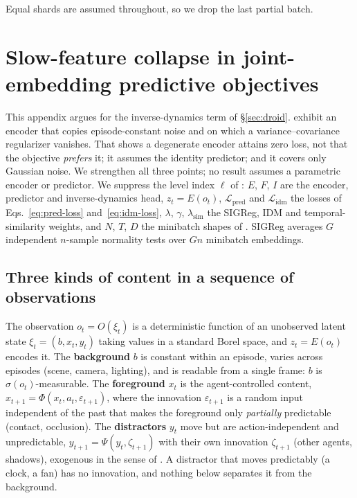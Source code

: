 Equal shards are assumed throughout, so we drop the last partial batch.

\section{Slow-feature collapse in joint-embedding predictive objectives}
\label{app:slowfeature}

This appendix argues for the inverse-dynamics term of \S\ref{sec:droid}. \citet{sobal2022slowfeatures} exhibit an encoder that copies episode-constant noise and on which a variance--covariance regularizer vanishes. That shows a degenerate encoder attains zero loss, not that the objective \emph{prefers} it; it assumes the identity predictor; and it covers only Gaussian noise. We strengthen all three points; no result assumes a parametric encoder or predictor. We suppress the level index $\ell$ of
: $E$, $F$, $I$ are the encoder, predictor and inverse-dynamics head,
$z_t = E(o_t)$, $\mathcal{L}_{\mathrm{pred}}$ and $\mathcal{L}_{\mathrm{idm}}$ the losses of
Eqs.~\eqref{eq:pred-loss} and~\eqref{eq:idm-loss}, $\lambda$, $\gamma$, $\lambda_{\mathrm{sim}}$
the SIGReg, IDM and temporal-similarity weights, and $N$, $T$, $D$ the minibatch shapes of
. SIGReg averages $G$ independent $n$-sample normality tests over
$Gn$ minibatch embeddings.

\subsection{Three kinds of content in a sequence of observations}
\label{app:sf-defn}

The observation $o_t = O(\xi_t)$ is a deterministic function of an unobserved latent state $\xi_t = (b, x_t, y_t)$ taking values in a standard Borel space, and $z_t = E(o_t)$ encodes it. The \textbf{background} $b$ is
constant within an episode, varies across episodes (scene, camera, lighting), and is readable from a single frame: $b$ is $\sigma(o_t)$-measurable. The \textbf{foreground} $x_t$ is the agent-controlled content,
$x_{t+1} = \Phi(x_t, a_t, \varepsilon_{t+1})$, where the innovation $\varepsilon_{t+1}$ is a
random input independent of the past that makes the foreground only \emph{partially}
predictable (contact, occlusion). The \textbf{distractors} $y_t$ move but
are action-independent and unpredictable, $y_{t+1} = \Psi(y_t,\zeta_{t+1})$ with their own
innovation $\zeta_{t+1}$ (other agents, shadows), exogenous in the sense of \citet{Efroni2021ProvableRW,pmlr-v162-wang22c}. A distractor that moves predictably (a clock, a fan) has no innovation, and nothing below separates it from the background.

